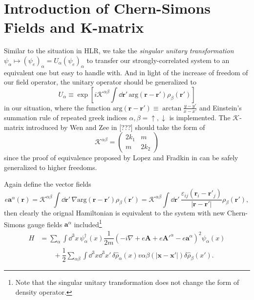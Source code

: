 \documentclass[bachelor,english,numbers]{ustcthesis}
\begin{document}
	\section{Introduction of Chern-Simons Fields and K-matrix}
		\indent\par Similar to the situation in HLR, we take the \emph{singular unitary transformation} $\psi_\alpha\mapsto(\psi_e)_\alpha=U_\alpha(\psi_e)_\alpha$ to transfer our strongly-correlated system to an equivalent one but easy to handle with. And in light of the increase of freedom of our field operator, the unitary operator should be generalized to 
		\begin{equation}\label{2.2.1}
			U_\alpha\equiv\exp \left[i\mathcal{K}^{\alpha \beta}\int\dd\bm{r'}\,\mathrm{arg}(\bm{r}-\bm{r'})\rho_\beta(\bm{r'}) \right]
		\end{equation}
		in our situation, where the function $\mathrm{arg}(\bm{r}-\bm{r'})\equiv\arctan\frac{y-y'}{x-x'}$ and Einstein's summation rule of repeated greek indices $\alpha,\beta=\uparrow,\downarrow$ is implemented. The $\mathcal{K}$-matrix introduced by Wen and Zee in [???] should take the form of \cite{mandal1996theory}
		\begin{equation}\label{2.2.2}
			\mathcal{K}^{\alpha \beta}=\left(\begin{array}{cc}
				2k_1 & m \\ m & 2k_2
			\end{array}\right) 
		\end{equation}
		since the proof of equivalence proposed by Lopez and Fradkin in \cite{lopez1991fractional} can be safely generalized to higher freedoms.\par
		Again define the vector fields
		\begin{equation}\label{2.2.3}
			e\bm{a}^\alpha(\bm{r})=\mathcal{K}^{\alpha \beta}\int\dd\bm{r'}\,\nabla\mathrm{arg}(\bm{r}-\bm{r'})\rho_\beta(\bm{r'})=\mathcal{K}^{\alpha\beta}\int\dd\bm{r'}\,\dfrac{\varepsilon_{ij}(\bm{r}_i-\bm{r'}_j)}{|\bm{r}-\bm{r'}|}\rho_\beta(\bm{r'}),
		\end{equation}
		then clearly the orignal Hamiltonian is equivalent to the system with new Chern-Simons gauge fields $\bm{a}^\alpha$ included\footnote{Note that the singular unitary transformation does not change the form of density operator.}
		\begin{align}\label{2.2.4}
			H&=\sum_\alpha\int\dd^3x\,\psi^\dagger_\alpha(x)\dfrac{1}{2m}\left(-i\nabla+e\bm{A}+e\bm{A'}^\alpha-e\bm{a}^\alpha\right)^2\psi_\alpha(x)\nonumber\\
			&\qquad+\dfrac{1}{2}\sum_{\alpha \beta}\int\dd^3x\dd^3x'\,\delta\hat{\rho}_\alpha(x)v{\alpha \beta}(|\bm{x}-\bm{x'}|)\delta\hat{\rho}_\beta(x').
		\end{align}
\end{document}
